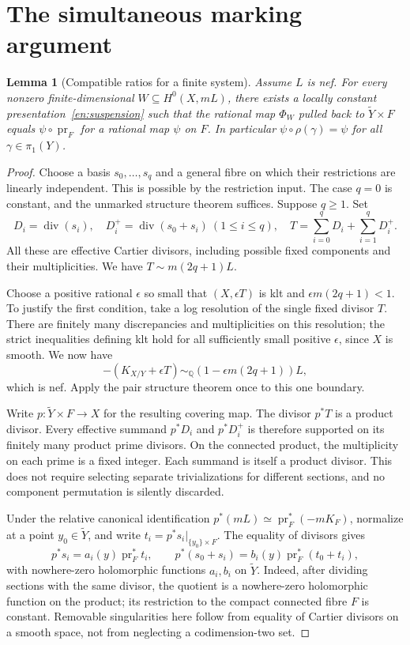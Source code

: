 \documentclass[12pt]{amsart}
\newtheorem{lem}[thm]{Lemma}
\theoremstyle{definition}
\theoremstyle{remark}
\numberwithin{equation}{section}
\newcommand{\Div}{\operatorname{div}}
\DeclareMathOperator{\pr}{pr}
\newcommand{\Q}{\mathbb{Q}}
\begin{document}
\section{The simultaneous marking argument}\label{en:mark}
\begin{lem}[Compatible ratios for a finite system]\label{en:marklemma}
Assume $L$ is nef. For every nonzero finite-dimensional $W\subseteq H^0(X,mL)$, there exists a locally constant presentation~\eqref{en:suspension} such that the rational map $\Phi_W$ pulled back to $\widetilde Y\times F$ equals $\psi\circ\pr_F$ for a rational map $\psi$ on $F$. In particular $\psi\circ\rho(\gamma)=\psi$ for all $\gamma\in\pi_1(Y)$.
\end{lem}
\begin{proof}
Choose a basis $s_0,\ldots,s_q$ and a general fibre on which their restrictions are linearly independent. This is possible by the restriction input. The case $q=0$ is constant, and the unmarked structure theorem suffices. Suppose $q\geq1$. Set
\[
 D_i=\Div(s_i),\quad D_i^+=\Div(s_0+s_i)\ (1\leq i\leq q),
 \quad T=\sum_{i=0}^qD_i+\sum_{i=1}^qD_i^+.
\]
All these are effective Cartier divisors, including possible fixed components and their multiplicities. We have $T\sim m(2q+1)L$.

Choose a positive rational $\epsilon$ so small that $(X,\epsilon T)$ is klt and $\epsilon m(2q+1)<1$. To justify the first condition, take a log resolution of the single fixed divisor $T$. There are finitely many discrepancies and multiplicities on this resolution; the strict inequalities defining klt hold for all sufficiently small positive $\epsilon$, since $X$ is smooth. We now have
\begin{equation}\label{en:perturb}
 -(K_{X/Y}+\epsilon T)\sim_\Q
 (1-\epsilon m(2q+1))L,
\end{equation}
which is nef. Apply the pair structure theorem once to this one boundary.

Write $p:\widetilde Y\times F\to X$ for the resulting covering map. The divisor $p^*T$ is a product divisor. Every effective summand $p^*D_i$ and $p^*D_i^+$ is therefore supported on its finitely many product prime divisors. On the connected product, the multiplicity on each prime is a fixed integer. Each summand is itself a product divisor. This does not require selecting separate trivializations for different sections, and no component permutation is silently discarded.

Under the relative canonical identification $p^*(mL)\simeq\pr_F^*(-mK_F)$, normalize at a point $y_0\in\widetilde Y$, and write $t_i=p^*s_i|_{\{y_0\}\times F}$. The equality of divisors gives
\[
 p^*s_i=a_i(y)\pr_F^*t_i,
 \qquad p^*(s_0+s_i)=b_i(y)\pr_F^*(t_0+t_i),
\]
with nowhere-zero holomorphic functions $a_i,b_i$ on $\widetilde Y$. Indeed, after dividing sections with the same divisor, the quotient is a nowhere-zero holomorphic function on the product; its restriction to the compact connected fibre $F$ is constant. Removable singularities here follow from equality of Cartier divisors on a smooth space, not from neglecting a codimension-two set.


\end{proof}
\end{document}
